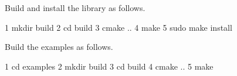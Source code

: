 \begin{DoxyItemize}
\item Build and install the library as follows.
\end{DoxyItemize}


\begin{DoxyCode}
1 mkdir build  
2 cd build
3 cmake ..
4 make
5 sudo make install
\end{DoxyCode}



\begin{DoxyItemize}
\item Build the examples as follows.
\end{DoxyItemize}


\begin{DoxyCode}
1 cd examples
2 mkdir build
3 cd build
4 cmake ..
5 make
\end{DoxyCode}
 